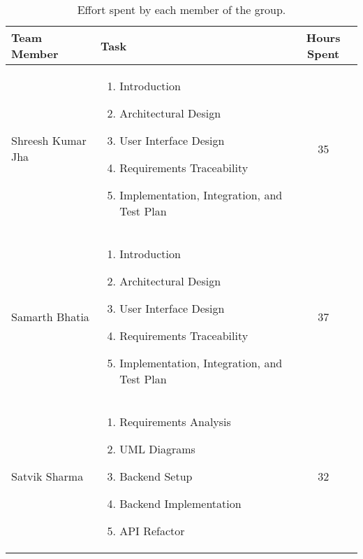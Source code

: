 \begin{table}[H]
    \centering
    \begin{tabular}{|p{}|p{}|c|}
        \hline
        \textbf{Team Member} & \textbf{Task} & \textbf{Hours Spent} \\ 
        \hline
        Shreesh Kumar Jha & 
        \begin{enumerate}
            \item Introduction
            \item Architectural Design
            \item User Interface Design
            \item Requirements Traceability
            \item Implementation, Integration, and Test Plan
        \end{enumerate} & 35 \\ 
        \hline
        Samarth Bhatia & 
        \begin{enumerate}
            \item Introduction
            \item Architectural Design
            \item User Interface Design
            \item Requirements Traceability
            \item Implementation, Integration, and Test Plan
        \end{enumerate} & 37 \\ 
        \hline
        Satvik Sharma & 
        \begin{enumerate}
            \item Requirements Analysis
            \item UML Diagrams
            \item Backend Setup
            \item Backend Implementation
            \item API Refactor
        \end{enumerate} & 32 \\ 
        \hline
    \end{tabular}
    \caption{Effort spent by each member of the group.}
    \label{tab:effort_spent}
\end{table}
